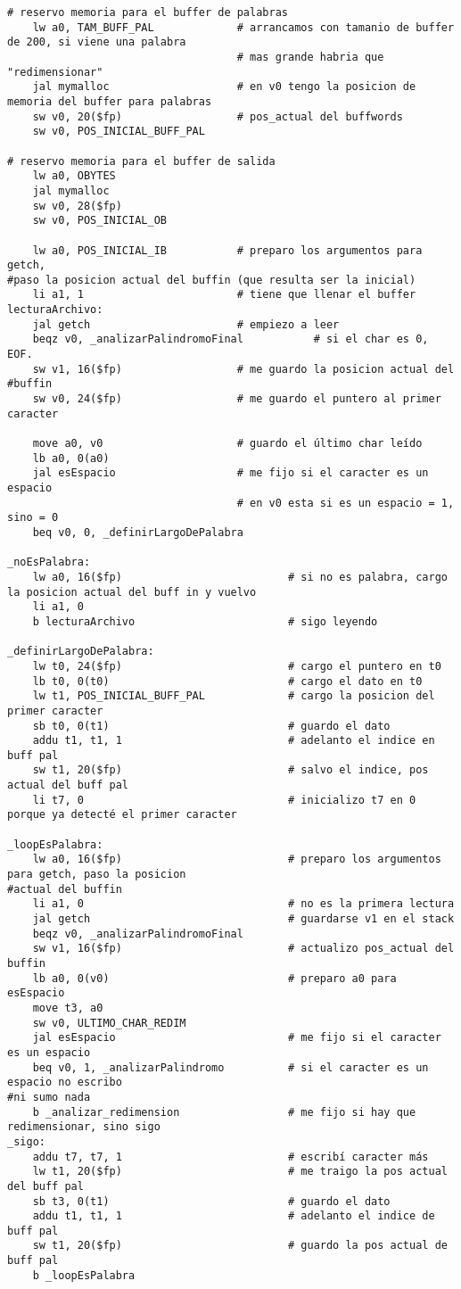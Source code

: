 \documentclass[a4paper,10pt]{article}
\begin{document}
\begin{itemize}
\begin{verbatim}
# reservo memoria para el buffer de palabras
	lw a0, TAM_BUFF_PAL				# arrancamos con tamanio de buffer de 200, si viene una palabra
									# mas grande habria que "redimensionar"
	jal mymalloc					# en v0 tengo la posicion de memoria del buffer para palabras
	sw v0, 20($fp)					# pos_actual del buffwords
	sw v0, POS_INICIAL_BUFF_PAL

# reservo memoria para el buffer de salida
	lw a0, OBYTES
	jal mymalloc
	sw v0, 28($fp)
	sw v0, POS_INICIAL_OB

	lw a0, POS_INICIAL_IB			# preparo los argumentos para getch,
#paso la posicion actual del buffin (que resulta ser la inicial)
	li a1, 1						# tiene que llenar el buffer
lecturaArchivo:
	jal getch						# empiezo a leer
	beqz v0, _analizarPalindromoFinal			# si el char es 0, EOF. 
	sw v1, 16($fp)					# me guardo la posicion actual del 
#buffin
	sw v0, 24($fp)					# me guardo el puntero al primer caracter
	
	move a0, v0						# guardo el último char leído
	lb a0, 0(a0)
	jal esEspacio					# me fijo si el caracter es un espacio
									# en v0 esta si es un espacio = 1, sino = 0
	beq v0, 0, _definirLargoDePalabra	

_noEsPalabra:
	lw a0, 16($fp)							# si no es palabra, cargo la posicion actual del buff in y vuelvo
	li a1, 0
	b lecturaArchivo						# sigo leyendo

_definirLargoDePalabra:
	lw t0, 24($fp)							# cargo el puntero en t0
	lb t0, 0(t0)							# cargo el dato en t0
	lw t1, POS_INICIAL_BUFF_PAL				# cargo la posicion del primer caracter
	sb t0, 0(t1)							# guardo el dato
	addu t1, t1, 1							# adelanto el indice en buff pal
	sw t1, 20($fp)							# salvo el indice, pos actual del buff pal
	li t7, 0								# inicializo t7 en 0 porque ya detecté el primer caracter

_loopEsPalabra:
	lw a0, 16($fp)							# preparo los argumentos para getch, paso la posicion
#actual del buffin
	li a1, 0								# no es la primera lectura
	jal getch								# guardarse v1 en el stack
	beqz v0, _analizarPalindromoFinal
	sw v1, 16($fp)							# actualizo pos_actual del buffin
	lb a0, 0(v0)							# preparo a0 para esEspacio
	move t3, a0
	sw v0, ULTIMO_CHAR_REDIM
	jal esEspacio							# me fijo si el caracter es un espacio
	beq v0, 1, _analizarPalindromo 			# si el caracter es un espacio no escribo 
#ni sumo nada
	b _analizar_redimension					# me fijo si hay que redimensionar, sino sigo
_sigo:	
	addu t7, t7, 1							# escribí caracter más
	lw t1, 20($fp)							# me traigo la pos actual del buff pal
	sb t3, 0(t1)							# guardo el dato
	addu t1, t1, 1							# adelanto el indice de buff pal
	sw t1, 20($fp)							# guardo la pos actual de buff pal
	b _loopEsPalabra


\end{verbatim}
\end{itemize}
\end{document}
